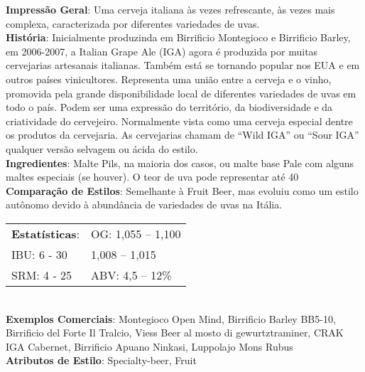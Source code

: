\textbf{Impressão Geral}: Uma cerveja italiana às vezes refrescante, às vezes mais complexa, caracterizada por diferentes variedades de uvas. \\
\textbf{História}: Inicialmente produzinda em Birrificio Montegioco e Birrificio Barley, em 2006-2007, a Italian Grape Ale (IGA) agora é produzida por muitas cervejarias artesanais italianas. Também está se tornando popular nos EUA e em outros países vinicultores. Representa uma união entre a cerveja e o vinho, promovida pela grande disponibilidade local de diferentes variedades de uvas em todo o país. Podem ser uma expressão do território, da biodiversidade e da criatividade do cervejeiro. Normalmente vista como uma cerveja especial dentre os produtos da cervejaria. As cervejarias chamam de “Wild IGA” ou “Sour IGA” qualquer versão selvagem ou ácida do estilo. \\
\textbf{Ingredientes}: Malte Pils, na maioria dos casos, ou malte base Pale com alguns maltes especiais (se houver). O teor de uva pode representar até 40%
\textbf{Comparação de Estilos}: Semelhante à Fruit Beer, mas evoluiu como um estilo autônomo devido à abundância de variedades de uvas na Itália. \\
\begin{tabular}{@{}p{35mm}p{35mm}@{}}
  \textbf{Estatísticas}: & OG: 1,055 – 1,100 \\
  IBU: 6 - 30 & 1,008 – 1,015 \\
  SRM: 4 - 25 & ABV: 4,5 – 12\%
\end{tabular}\\
\textbf{Exemplos Comerciais}: Montegioco Open Mind, Birrificio Barley BB5-10, Birrificio del Forte Il Tralcio, Viess Beer al mosto di gewurtztraminer, CRAK IGA Cabernet, Birrificio Apuano Ninkasi, Luppolajo Mons Rubus \\
\textbf{Atributos de Estilo}: Specialty-beer, Fruit
